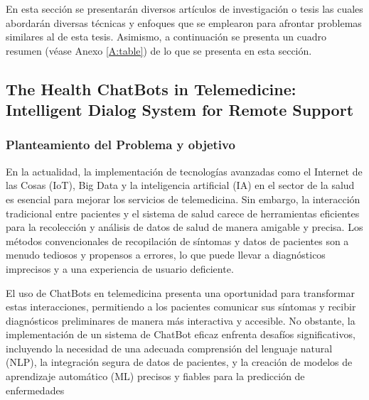 En esta sección se presentarán diversos artículos de investigación o tesis las cuales abordarán diversas técnicas y enfoques que se emplearon para afrontar problemas similares al de esta tesis. Asimismo, a continuación se presenta un cuadro resumen (véase Anexo \ref{A:table}) de lo que se presenta en esta sección.

\subsection{The Health ChatBots in Telemedicine: Intelligent Dialog System for Remote Support}
	\subsubsection{Planteamiento del Problema y objetivo }
		En la actualidad, la implementación de tecnologías avanzadas como el Internet de las Cosas (IoT), Big Data y la inteligencia artificial (IA) en el sector de la salud es esencial para mejorar los servicios de telemedicina. Sin embargo, la interacción tradicional entre pacientes y el sistema de salud carece de herramientas eficientes para la recolección y análisis de datos de salud de manera amigable y precisa. Los métodos convencionales de recopilación de síntomas y datos de pacientes son a menudo tediosos y propensos a errores, lo que puede llevar a diagnósticos imprecisos y a una experiencia de usuario deficiente.
		
		El uso de ChatBots en telemedicina presenta una oportunidad para transformar estas interacciones, permitiendo a los pacientes comunicar sus síntomas y recibir diagnósticos preliminares de manera más interactiva y accesible. No obstante, la implementación de un sistema de ChatBot eficaz enfrenta desafíos significativos, incluyendo la necesidad de una adecuada comprensión del lenguaje natural (NLP), la integración segura de datos de pacientes, y la creación de modelos de aprendizaje automático (ML) precisos y fiables para la predicción de enfermedades
	
